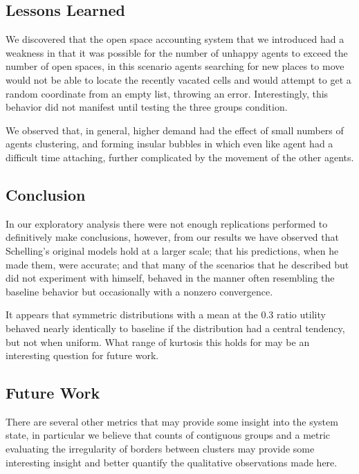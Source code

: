 \documentclass[sigplan,nonacm]{acmart}
\begin{document}
\subsection{Lessons Learned}

We discovered that the open space accounting system that we introduced had a weakness in that it was possible 
for the number of unhappy agents to exceed the number of open spaces,
in this scenario agents searching for new places to move would not be able to locate the recently vacated cells and would
attempt to get a random coordinate from an empty list, throwing an error. Interestingly, this behavior did not manifest until testing the three groups condition.

We observed that, in general, higher demand had the effect of small numbers of agents clustering, 
and forming insular bubbles in which even like agent had a difficult time attaching, further complicated by the movement of the other agents.

\subsection{Conclusion}

In our exploratory analysis there were not enough replications performed to definitively make conclusions, however, from our results
we have observed that Schelling's original models hold at a larger scale; that his predictions, when he made them, were accurate;
and that many of the scenarios that he described but did not experiment with himself, behaved in the manner often resembling
the baseline behavior but occasionally with a nonzero convergence.

It appears that symmetric distributions with a mean at the 0.3 ratio utility behaved nearly identically to baseline if
the distribution had a central tendency, but not when uniform. 
What range of kurtosis this holds for may be an interesting question for future work.

\subsection{Future Work}

There are several other metrics that may provide some insight into the system state, in particular we believe that 
counts of contiguous groups and a metric evaluating the irregularity of borders between clusters may provide some interesting insight
and better quantify the qualitative observations made here.





\end{document}
